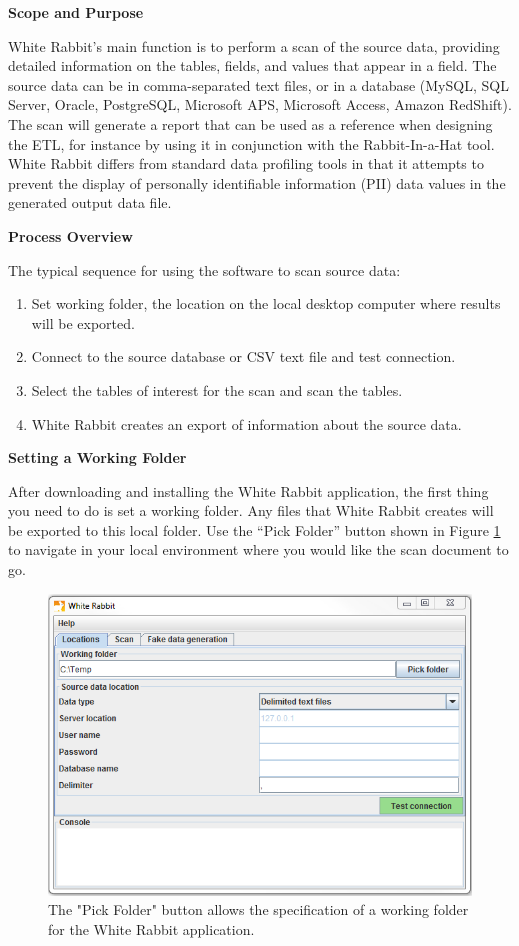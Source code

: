\documentclass[11pt]{book}
\providecommand{\tightlist}{%
  \setlength{\itemsep}{0pt}\setlength{\parskip}{0pt}}
\theoremstyle{definition}
\theoremstyle{definition}
\theoremstyle{definition}
\theoremstyle{remark}
\begin{document}
\textbf{Scope and Purpose}

White Rabbit's main function is to perform a scan of the source data, providing detailed information on the tables, fields, and values that appear in a field. The source data can be in comma-separated text files, or in a database (MySQL, SQL Server, Oracle, PostgreSQL, Microsoft APS, Microsoft Access, Amazon RedShift). The scan will generate a report that can be used as a reference when designing the ETL, for instance by using it in conjunction with the Rabbit-In-a-Hat tool. White Rabbit differs from standard data profiling tools in that it attempts to prevent the display of personally identifiable information (PII) data values in the generated output data file.

\textbf{Process Overview}

The typical sequence for using the software to scan source data:

\begin{enumerate}
\def\labelenumi{\arabic{enumi}.}
\tightlist
\item
  Set working folder, the location on the local desktop computer where results will be exported.
\item
  Connect to the source database or CSV text file and test connection.
\item
  Select the tables of interest for the scan and scan the tables.
\item
  White Rabbit creates an export of information about the source data.
\end{enumerate}

\textbf{Setting a Working Folder}

After downloading and installing the White Rabbit application, the first thing you need to do is set a working folder. Any files that White Rabbit creates will be exported to this local folder. Use the ``Pick Folder'' button shown in Figure \ref{fig:WhiteRabbitLocation} to navigate in your local environment where you would like the scan document to go.

\begin{figure}
\includegraphics[width=1\linewidth]{images/ExtractTransformLoad/WhiteRabbitLocation} \caption{The "Pick Folder" button allows the specification of a working folder for the White Rabbit application.}\label{fig:WhiteRabbitLocation}
\end{figure}
\end{document}
